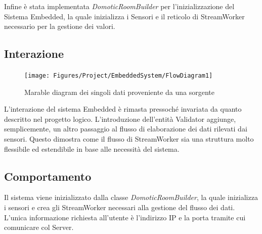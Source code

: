 Infine \`e stata implementata \textit{DomoticRoomBuilder} per l'inizializzazione del Sistema Embedded, la quale inizializza i Sensori e il reticolo di StreamWorker necessario per la gestione dei valori.

\subsection{Interazione}

\begin{figure}[ht]
\centering
\texttt{[image: Figures/Project/EmbeddedSystem/FlowDiagram1]}
\caption{Marable diagram dei singoli dati proveniente da una sorgente}
\end{figure}

L'interazione del sistema Embedded è rimasta pressoch\'e invariata da quanto descritto nel progetto logico.
L'introduzione dell'entit\`a Validator aggiunge, semplicemente, un altro passaggio al flusso di elaborazione dei dati rilevati dai sensori.
Questo dimostra come il flusso di StreamWorker sia una struttura molto flessibile ed estendibile in base alle necessità del sistema.

\subsection{Comportamento}

Il sistema viene inizializzato dalla classe \textit{DomoticRoomBuilder}, la quale inizializza i sensori e crea gli StreamWorker necessari alla gestione del flusso dei dati.
L'unica informazione richiesta all'utente è l'indirizzo IP e la porta tramite cui comunicare col Server.
